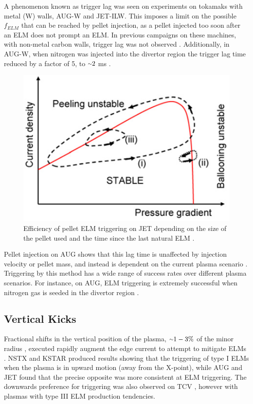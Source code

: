 \documentclass[11pt, twocolumn]{article}  %
\providecommand{\squiggle}{\raise.17ex\hbox{$\scriptstyle\sim$}} %
\newcommand{\citep}[1]{\cite{#1}}
\begin{document}
A phenomenon known as trigger lag was seen on experiments on tokamaks with metal (W) walls, AUG-W and JET-ILW. This imposes a limit on the possible $f_{ELM}$ that can be reached by pellet injection, as a pellet injected too soon after an ELM does not prompt an ELM. In previous campaigns on these machines, with non-metal carbon walls, trigger lag was not observed \cite{Baylor2015}. Additionally, in AUG-W, when nitrogen was injected into the divertor region the trigger lag time reduced by a factor of 5, to $\squiggle 2$ ms \citep{Baylor2015}. 

\begin{figure}
\includegraphics[scale=0.35]{Figures/ELMcycles.png}
\centering
\caption{Efficiency of pellet ELM triggering on JET depending on the size of the pellet used and the time since the last natural ELM \cite{Baylor2015}.}\label{fig:PI_ELMprob}
\end{figure}

Pellet injection on AUG shows that this lag time is unaffected by injection velocity or pellet mass, and instead is dependent on the current plasma scenario \cite{Lang2014}. Triggering by this method has a wide range of success rates over different plasma scenarios. For instance, on AUG, ELM triggering is extremely successful when nitrogen gas is seeded in the divertor region \cite{Kallenbach2012}. 


\subsection{Vertical Kicks}\label{ssec:Vkicks}
Fractional shifts in the vertical position of the plasma, $\squiggle 1-3\%$ of the minor radius \cite{KirkFF}, executed rapidly augment the edge current to attempt to mitigate ELMs \cite{DelaLuna2016}. NSTX \cite{Gerhardt2010} and KSTAR \cite{Kim2012} produced results showing that the triggering of type I ELMs when the plasma is in upward motion (away from the X-point), while AUG \cite{Lang2004} and JET \cite{DelaLuna2016} found that the precise opposite was more consistent at ELM triggering. The downwards preference for triggering was also observed on TCV \cite{Degeling2003}, however with plasmas with type III ELM production tendencies.
\end{document}
